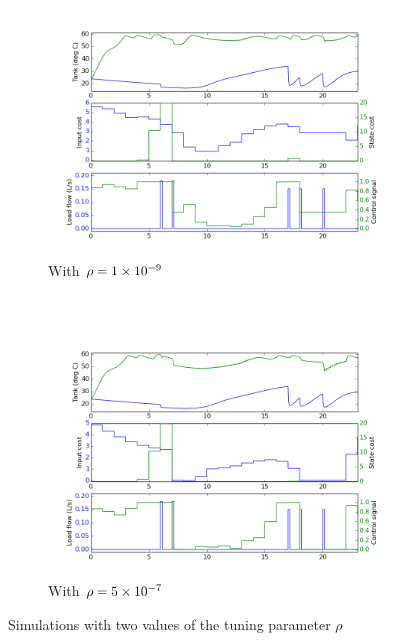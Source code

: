 \begin{figure}
   \centering
   \begin{subfigure}[b]{0.85\textwidth}
      \includegraphics[width=\textwidth]{results/mpc-rho-19}
      \caption{With $\rho = 1\times 10^{-9}$}
      \label{fig:mpc-rho-small}
   \end{subfigure}
   \\
   \begin{subfigure}[b]{0.85\textwidth}
      \includegraphics[width=\textwidth]{results/mpc-rho-57}
      \caption{With $\rho = 5\times 10^{-7}$}
      \label{fig:mpc-rho-larger}
   \end{subfigure}
   \caption{Simulations with two values of the tuning parameter $\rho$}
   \label{fig:mpc-rho}
\end{figure}

